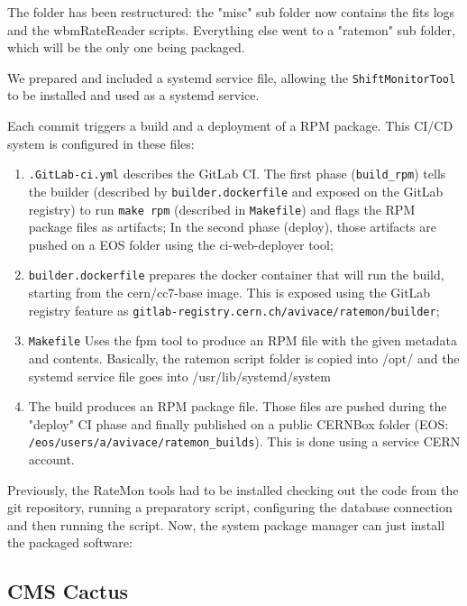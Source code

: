 The folder has been restructured: the "misc" sub folder now contains the fits logs and the wbmRateReader scripts. Everything else went to a "ratemon" sub folder, which will be the only one being packaged.

We prepared and included a systemd service file, allowing the \texttt{ShiftMonitorTool} to be installed and used as a systemd service.

Each commit triggers a build and a deployment of a RPM package. This CI/CD system is configured in these files:

\begin{enumerate}
    \item \texttt{.GitLab-ci.yml} describes the GitLab CI. The first phase (\texttt{build\_rpm}) tells the builder (described by \texttt{builder.dockerfile} and exposed on the GitLab registry) to run \texttt{make rpm} (described in \texttt{Makefile}) and flags the RPM package files as artifacts; In the second phase (deploy), those artifacts are pushed on a EOS folder using the ci-web-deployer tool;
    \item \texttt{builder.dockerfile} prepares the docker container that will run the build, starting from the cern/cc7-base image. This is exposed using the GitLab registry feature as \texttt{gitlab-registry.cern.ch/avivace/ratemon/builder};
    \item \texttt{Makefile} Uses the fpm tool to produce an RPM file with the given metadata and contents. Basically, the ratemon script folder is copied into /opt/ and the systemd service file goes into /usr/lib/systemd/system
    \item The build produces an RPM package file. Those files are pushed during the "deploy" CI phase and finally published on a public CERNBox folder (EOS: \texttt{/eos/users/a/avivace/ratemon\_builds}). This is done using a service CERN account.
\end{enumerate}

Previously, the RateMon tools had to be installed checking out the code from the git repository, running a preparatory script, configuring the database connection and then running the script. Now, the system package manager can just install the packaged software:


\subsection{CMS Cactus}


